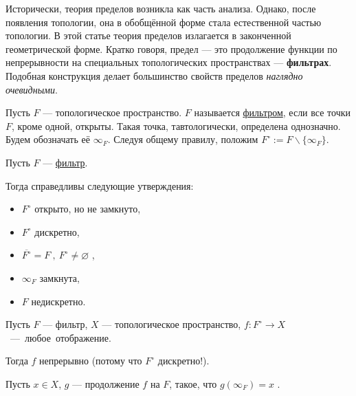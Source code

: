



    
\SScover
    

Исторически, теория пределов возникла как часть анализа. 
Однако, после появления топологии, она в обобщённой форме стала естественной частью топологии. 
В этой статье теория пределов излагается в законченной геометрической форме. 
Кратко говоря, предел --- это продолжение функции по непрерывности на специальных топологических пространствах --- \mbox{\textbf{фильтрах}}. 
Подобная конструкция делает большинство свойств пределов \textit{наглядно очевидными}.

\vspace
    
\SSbullet 

\SSsect[def] Пусть \( F \) --- топологическое пространство. 
\( F \) называется \underline{фильтром}, если все точки \( F \), кроме одной, открыты. 
Такая точка, тавтологически, определена однозначно. 
Будем обозначать её \( \infty_F \). 
Следуя общему правилу, положим \( F^\circ := F\backslash\{\infty_F\} \).

\SSsect Пусть \( F \) --- \underline{фильтр}. 

Тогда справедливы следующие утверждения:
\begin{itemize}[label=]
\item \( F^\circ \) открыто, но не замкнуто,
\item \( F^\circ \) дискретно,
\item \( \overline{F^\circ} = F ~,~ F^\circ\neq\varnothing \) ,
\item \( \infty_F \) замкнута,
\item \( F \) недискретно.
\end{itemize}

\pagebreak

\SSsect[def] Пусть \( F \) --- фильтр, \( X \) --- топологическое пространство, 
\mbox{\( f: F^\circ \rightarrow X \) --- любое отображение}. 

Тогда \( f \) непрерывно (потому что \( F^\circ \) дискретно!).

Пусть \( x \in X \), \( g \) --- продолжение \( f \) на \( F \), такое, что \( g(\infty_F) = x \) .

